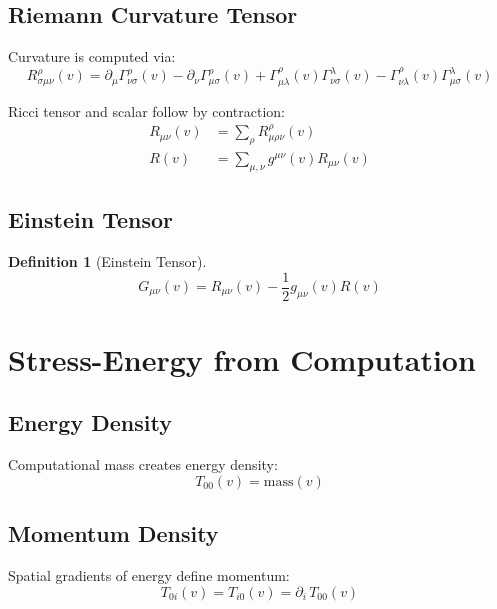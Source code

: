 \documentclass[11pt,twocolumn]{article}
\newtheorem{definition}{Definition}
\begin{document}
\subsection{Riemann Curvature Tensor}

Curvature is computed via:
\begin{equation}
R^\rho_{\sigma\mu\nu}(v) = \partial_\mu \Gamma^\rho_{\nu\sigma}(v) - \partial_\nu \Gamma^\rho_{\mu\sigma}(v) + \Gamma^\rho_{\mu\lambda}(v)\Gamma^\lambda_{\nu\sigma}(v) - \Gamma^\rho_{\nu\lambda}(v)\Gamma^\lambda_{\mu\sigma}(v)
\end{equation}

Ricci tensor and scalar follow by contraction:
\begin{align}
R_{\mu\nu}(v) &= \sum_\rho R^\rho_{\mu\rho\nu}(v) \\
R(v) &= \sum_{\mu,\nu} g^{\mu\nu}(v) R_{\mu\nu}(v)
\end{align}

\subsection{Einstein Tensor}

\begin{definition}[Einstein Tensor]
\begin{equation}
G_{\mu\nu}(v) = R_{\mu\nu}(v) - \frac{1}{2}g_{\mu\nu}(v) R(v)
\end{equation}
\end{definition}

\section{Stress-Energy from Computation}

\subsection{Energy Density}

Computational mass creates energy density:
\begin{equation}
T_{00}(v) = \text{mass}(v)
\end{equation}

\subsection{Momentum Density}

Spatial gradients of energy define momentum:
\begin{equation}
T_{0i}(v) = T_{i0}(v) = \partial_i \, T_{00}(v)
\end{equation}
\end{document}
